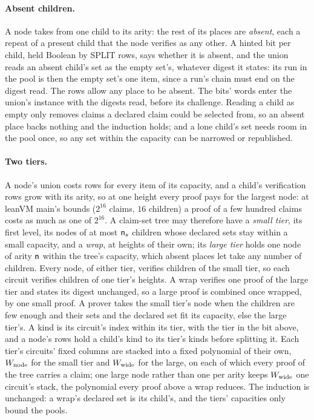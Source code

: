 \paragraph{Absent children.} A node takes from one child to its arity: the rest of its places are \emph{absent}, each a repeat of a present child that the node verifies as any other. A hinted bit per child, held Boolean by \textsf{SPLIT} rows, says whether it is absent, and the union reads an absent child's set as the empty set's, whatever digest it states: its run in the pool is then the empty set's one item, since a run's chain must end on the digest read. The rows allow any place to be absent. The bits' words enter the union's instance with the digests read, before its challenge. Reading a child as empty only removes claims a declared claim could be selected from, so an absent place backs nothing and the induction holds; and a lone child's set needs room in the pool once, so any set within the capacity can be narrowed or republished.

\paragraph{Two tiers.} A node's union costs rows for every item of its capacity, and a child's verification rows grow with its arity, so at one height every proof pays for the largest node: at leanVM main's bounds ($2^{16}$ claims, $16$ children) a proof of a few hundred claims costs as much as one of $2^{16}$. A claim-set tree may therefore have a \emph{small tier}, its first level, its nodes of at most $\mathsf{n}_s$ children whose declared sets stay within a small capacity, and a \emph{wrap}, at heights of their own; its \emph{large tier} holds one node of arity $\mathsf{n}$ within the tree's capacity, which absent places let take any number of children. Every node, of either tier, verifies children of the small tier, so each circuit verifies children of one tier's heights. A wrap verifies one proof of the large tier and states its digest unchanged, so a large proof is combined once wrapped, by one small proof. A prover takes the small tier's node when the children are few enough and their sets and the declared set fit its capacity, else the large tier's. A kind is its circuit's index within its tier, with the tier in the bit above, and a node's rows hold a child's kind to its tier's kinds before splitting it. Each tier's circuits' fixed columns are stacked into a fixed polynomial of their own, $W_{\mathrm{node}}$ for the small tier and $W_{\mathrm{wide}}$ for the large, on each of which every proof of the tree carries a claim; one large node rather than one per arity keeps $W_{\mathrm{wide}}$ one circuit's stack, the polynomial every proof above a wrap reduces. The induction is unchanged: a wrap's declared set is its child's, and the tiers' capacities only bound the pools.


